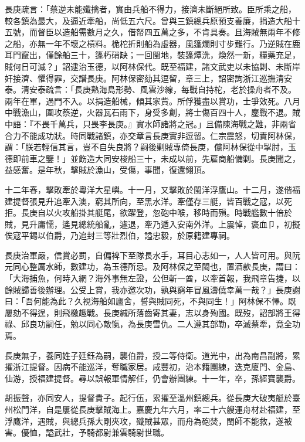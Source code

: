 \begin{pinyinscope}
長庚疏言：「蔡逆未能殲擒者，實由兵船不得力，接濟未斷絕所致。臣所乘之船，較各鎮為最大，及逼近牽船，尚低五六尺。曾與三鎮總兵原預支養廉，捐造大船十五號，而督臣以造船需數月之久，借帑四五萬之多，不肯具奏。且海賊無兩年不修之船，亦無一年不壞之槓料。桅柁折則船為虛器，風篷爛則寸步難行。乃逆賊在鹿耳門竄出，僅餘船三十，篷朽硝缺；一回閩地，裝篷燂洗，煥然一新，糧藥充足，賊何日可滅？」詔逮治玉德，以阿林保代。既至福建，諸文武吏以未協剿、未斷岸奸接濟、懼得罪，交譖長庚。阿林保密劾其逗留，章三上，詔密詢浙江巡撫清安泰。清安泰疏言：「長庚熟海島形勢、風雲沙線，每戰自持柁，老於操舟者不及。兩年在軍，過門不入。以捐造船械，傾其家貲。所俘獲盡以賞功，士爭效死。八月中戰漁山，圍攻蔡逆，火器瓦石雨下，身受多創，將士傷百四十人，鏖戰不退。賊中語：『不畏千萬兵，只畏李長庚。』實水師諸將之冠。」且備陳海戰之難，非兩省合力不能成功狀。時同戰諸鎮，亦交章言長庚實非逗留。仁宗震怒，切責阿林保，謂：「朕若輕信其言，豈不自失良將？嗣後剿賊專倚長庚，儻阿林保從中掣肘，玉德即前車之鑒！」並飭造大同安梭船三十，未成以前，先雇商船備剿。長庚聞之，益感奮。是年秋，擊賊於漁山，受傷，事聞，復還翎頂。

十二年春，擊敗牽於粵洋大星嶼。十一月，又擊敗於閩洋浮鷹山。十二月，遂偕福建提督張見升追牽入澳，窮其所向，至黑水洋。牽僅存三艇，皆百戰之寇，以死拒。長庚自以火攻船掛其艇尾，欲躍登，忽砲中喉，移時而殞。時戰艦數十倍於賊，見升庸懦，遙見總統船亂，遽退，牽乃遁入安南外洋。上震悼，褒血⼙，初擬俟寇平錫以伯爵，乃追封三等壯烈伯，謚忠毅，於原籍建專祠。

長庚治軍嚴，信賞必罰，自偏裨下至隊長水手，耳目心志如一，人人皆可用。與阮元同心整厲水師，數建功，為玉德所忌。及阿林保之至閩也，置酒款長庚，謂曰：「大海捕魚，何時入網？海外事無左證，公但斬一酋，以牽首報，我飛章告捷，以餘賊歸善後辦理。公受上賞，我亦邀次功，孰與窮年冒風濤僥幸萬一哉？」長庚謝曰：「吾何能為此？久視海船如廬舍，誓與賊同死，不與同生！」阿林保不懌。既屢劾不得逞，則飛檄趣戰。長庚緘所落齒寄其妻，志以身殉國。既歿，詔部將王得祿、邱良功嗣任，勉以同心敵愾，為長庚雪仇。二人遵其部勒，卒滅蔡牽，竟全功焉。

長庚無子，養同姓子廷鈺為嗣，襲伯爵，授二等侍衛。道光中，出為南昌副將，累擢浙江提督。因病不能巡洋，奪職家居。咸豐初，治本籍團練，迭克廈門、金島、仙游，授福建提督。尋以誤報軍情解任，仍會辦團練。十一年，卒，孫經寶襲爵。

胡振聲，亦同安人，提督貴子。起行伍，累擢至溫州鎮總兵。從長庚大破夷艇於臺州松門洋，自是屢從長庚擊賊海上。嘉慶九年六月，率二十六艘運舟材赴福建，至浮鷹洋，遇賊，與總兵孫大剛夾攻，殲賊甚眾，而舟為砲焚，閩師不能救，遂被害。優恤，謚武壯，予騎都尉兼雲騎尉世職。


\end{pinyinscope}
